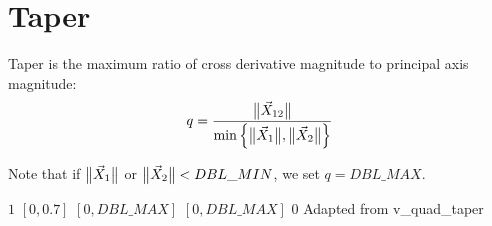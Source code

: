 \section{Taper}

Taper is the maximum ratio of cross derivative magnitude to principal axis magnitude:
\[
q = \frac {\big\lVert{\vec X_{12}}\big\rVert} {\min \left\{ \big\lVert{\vec X_1}\big\rVert, \big\lVert{\vec X_2}\big\rVert \right\}}
\]

Note that if $\big\lVert{\vec X_1}\big\rVert$ or $\big\lVert{\vec X_2}\big\rVert < DBL\_MIN$, we set $q = DBL\_MAX$.

%
{$1$}%
{$[0,0.7]$}%
{$[0,DBL\_MAX]$}%
{$[0,DBL\_MAX]$}%
{$0$}%
{Adapted from \cite{rob:87}}%
{v\_quad\_taper}%

